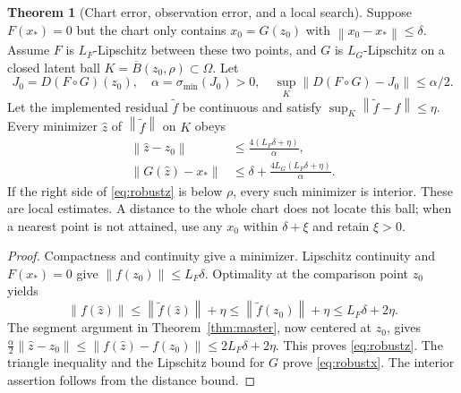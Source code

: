 \documentclass[11pt,a4paper]{article}
\theoremstyle{definition}
\newtheorem{theorem}{Theorem}[section]
\theoremstyle{definition}
\theoremstyle{remark}\newtheorem{remark}[theorem]{Remark}
\newcommand{\smin}{\sigma_{\min}}\newcommand{\smax}{\sigma_{\max}}
\newcommand{\norm}[1]{\left\lVert #1\right\rVert}
\begin{document}
\begin{theorem}[Chart error, observation error, and a local search]\label{thm:robust}
Suppose $F(x_*)=0$ but the chart only contains $x_0=G(z_0)$ with $\norm{x_0-x_*}\le\delta$. Assume $F$ is $L_F$-Lipschitz between these two points, and $G$ is $L_G$-Lipschitz on a closed latent ball $K=\overline B(z_0,\rho)\subset\Omega$. Let
\[
J_0=D(F\circ G)(z_0),\quad\alpha=\smin(J_0)>0,\quad
\sup_K\norm{D(F\circ G)-J_0}\le\alpha/2.
\]
Let the implemented residual $\widetilde f$ be continuous and satisfy $\sup_K\norm{\widetilde f-f}\le\eta$. Every minimizer $\widehat z$ of $\norm{\widetilde f}$ on $K$ obeys
\begin{align}
\norm{\widehat z-z_0}&\le\frac{4(L_F\delta+\eta)}\alpha,\label{eq:robustz}\\
\norm{G(\widehat z)-x_*}&\le\delta+\frac{4L_G(L_F\delta+\eta)}\alpha.\label{eq:robustx}
\end{align}
If the right side of \eqref{eq:robustz} is below $\rho$, every such minimizer is interior. These are local estimates. A distance to the whole chart does not locate this ball; when a nearest point is not attained, use any $x_0$ within $\delta+\xi$ and retain $\xi>0$.
\end{theorem}
\begin{proof}
Compactness and continuity give a minimizer. Lipschitz continuity and $F(x_*)=0$ give $\norm{f(z_0)}\le L_F\delta$. Optimality at the comparison point $z_0$ yields
\[
\norm{f(\widehat z)}\le\norm{\widetilde f(\widehat z)}+\eta
\le\norm{\widetilde f(z_0)}+\eta\le L_F\delta+2\eta.
\]
The segment argument in Theorem~\ref{thm:master}, now centered at $z_0$, gives
$\frac\alpha2\norm{\widehat z-z_0}\le\norm{f(\widehat z)-f(z_0)}\le2L_F\delta+2\eta$.
This proves \eqref{eq:robustz}. The triangle inequality and the Lipschitz bound for $G$ prove \eqref{eq:robustx}. The interior assertion follows from the distance bound.
\end{proof}
\end{document}
